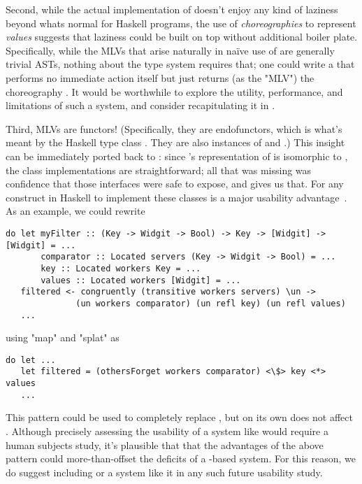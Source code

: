 Second, while the actual implementation of \minichor doesn't enjoy any kind of laziness beyond whats normal for Haskell programs,
the use of \emph{choreographies} to represent \emph{values} suggests that laziness could be built on top without additional boiler plate.
Specifically, while the MLVs that arise naturally in naïve use of \minichor are generally trivial  ASTs,
nothing about the type system requires that;
one could write a  that performs no immediate action itself but just returns
(as the "MLV") the choreography .
It would be worthwhile to explore the utility, performance, and limitations of such a system,
and consider recapitulating it in \MultiChor.

Third, MLVs are functors!
(Specifically, they are endofunctors, which is what's meant by the Haskell type class .
They are also instances of  and .)
This insight can be immediately ported back to \MultiChor:
since \MultiChor's representation of  is isomorphic to ,
the class implementations are straightforward;
all that was missing was confidence that those interfaces were safe to expose, and \minichor gives us that.
For any construct in Haskell to implement these classes is a major usability advantage~\cite[Chapter~4]{haskell-cookbook}.
As an example, we could rewrite
\begin{verbatim}
do let myFilter :: (Key -> Widgit -> Bool) -> Key -> [Widgit] -> [Widgit] = ...
       comparator :: Located servers (Key -> Widgit -> Bool) = ...
       key :: Located workers Key = ...
       values :: Located workers [Widgit] = ...
   filtered <- congruently (transitive workers servers) \un ->
              (un workers comparator) (un refl key) (un refl values)
   ...
\end{verbatim}
using "map" and "splat" as 
\begin{verbatim}
do let ...
   let filtered = (othersForget workers comparator) <\$> key <*> values
   ...
\end{verbatim}
This pattern could be used to completely replace ,
but on its own does not affect .
Although precisely assessing the usability of a system like \MultiChor would require a human subjects study,
it's plausible that that the advantages of the above pattern could more-than-offset the deficits of a -based system.
For this reason, we do suggest including \minichor or a system like it in any such future usability study.


